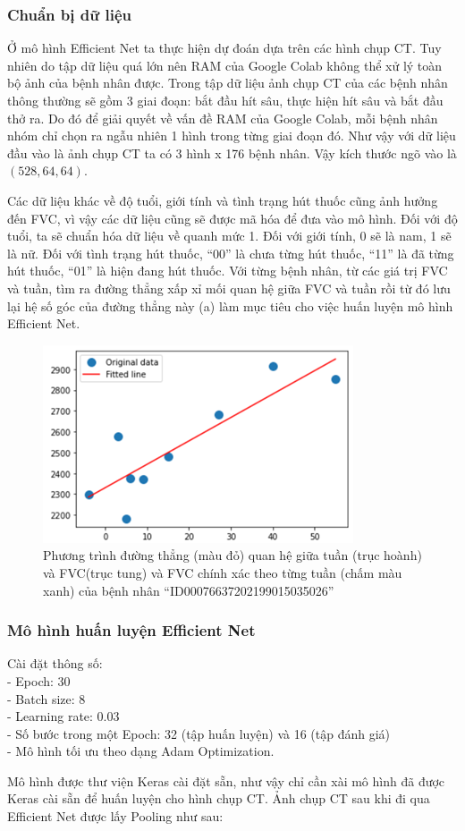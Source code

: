 \subsubsection{Chuẩn bị dữ liệu}
Ở mô hình Efficient Net ta thực hiện dự đoán dựa trên các hình chụp CT. Tuy nhiên do tập dữ liệu quá lớn nên RAM của Google Colab không thể xử lý toàn bộ ảnh của bệnh nhân được. Trong tập dữ liệu ảnh chụp CT của các bệnh nhân thông thường sẽ gồm 3 giai đoạn: bắt đầu hít sâu, thực hiện hít sâu và bắt đầu thở ra. Do đó để giải quyết về vấn đề RAM của Google Colab, mỗi bệnh nhân nhóm chỉ chọn ra ngẫu nhiên 1 hình trong từng giai đoạn đó. Như vậy với dữ liệu đầu vào là ảnh chụp CT ta có 3 hình x 176 bệnh nhân. Vậy kích thước ngõ vào là $(528,64,64)$.\par
Các dữ liệu khác về độ tuổi, giới tính và tình trạng hút thuốc cũng ảnh hưởng đến FVC, vì vậy các dữ liệu cũng sẽ được mã hóa để đưa vào mô hình. Đối với độ tuổi, ta sẽ chuẩn hóa dữ liệu về quanh mức 1. Đối với giới tính, 0 sẽ là nam, 1 sẽ là nữ. Đối với tình trạng hút thuốc, “00” là chưa từng hút thuốc, “11” là đã từng hút thuốc, “01” là hiện đang hút thuốc.
Với từng bệnh nhân, từ các giá trị FVC và tuần, tìm ra đường thẳng xấp xỉ mối quan hệ giữa FVC và tuần rồi từ đó lưu lại hệ số góc của đường thẳng này (a) làm mục tiêu cho việc huấn luyện mô hình Efficient Net.\par
\begin{figure}[ht!]
\centerline{\includegraphics[scale=0.6]{images/train1.png}}
\caption{Phương trình đường thẳng (màu đỏ) quan hệ giữa tuần (trục hoành) và FVC(trục tung) và FVC chính xác theo từng tuần (chấm màu xanh) của bệnh nhân “ID00076637202199015035026”}
\label{fig:train1}
\end{figure}
\subsubsection{Mô hình huấn luyện Efficient Net}
Cài đặt thông số: \\
\tab - Epoch: 30\\
\tab - Batch size: 8\\
\tab - Learning rate: 0.03 \\
\tab - Số bước trong một Epoch: 32 (tập huấn luyện) và 16 (tập đánh giá)\\
\tab - Mô hình tối ưu theo dạng Adam Optimization.\par
Mô hình  được thư viện Keras cài đặt sẵn, như vậy chỉ cần xài mô hình đã được Keras cài sẵn để huấn luyện cho hình chụp CT. Ảnh chụp CT sau khi đi qua Efficient Net được lấy Pooling như sau:\par

